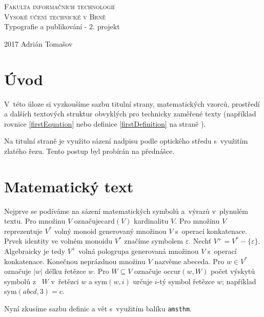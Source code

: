 \documentclass[a4paper, 11pt]{article}
\theoremstyle{definition}
\theoremstyle{theorem}
\begin{document}
\begin{center}
\thispagestyle{empty}
\Huge
\textsc{Fakulta informačních technologií\\
Vysoké učení technické v Brně}\\
Typografie a publikování - 2. projekt\\
\end{center}
{\LARGE 2017 \hfill Adrián Tomašov}

\newpage
\setcounter{page}{1}
\twocolumn

\section*{Úvod}
V~této úloze si vyzkoušíme sazbu titulní strany, matematických vzorců, prostředí a dalších textových struktur obvyklých pro technicky zaměřené texty (například rovnice \ref{firstEquation} nebo definice \ref{firstDefinition} na straně \pageref{firstDefinition}).

Na titulní straně je využito sázení nadpisu podle op\-tického středu s~využitím zlatého řezu. Tento postup byl probírán na přednášce.


\section{Matematický text}

Nejprve se podíváme na sázení matematických symbolů a~výrazů v~plynulém textu. Pro množinu $V$ označuje\linebreak card$(V)$ kardinalitu $V$.
Pro množinu $V$ reprezentuje $V^*$ volný monoid generovaný množinou $V$  s~operací konkatenace.
Prvek identity ve volném monoidu $V^*$ značíme symbolem $\varepsilon$.
Nechť $V^+ = V^*-\{\varepsilon\}$. Algebraicky je tedy $V^+$ volná pologrupa generovaná množinou $V$ s~operací konkatenace.
Konečnou neprázdnou množinu $V$ nazvěme abeceda.
Pro $w \in V^*$ označuje $|w|$ délku řetězce $w$. Pro $W \subseteq V$ označuje occur$(w, W)$ počet výskytů symbolů z~ $W$ v~řetězci $w$ a sym$(w,i)$ určuje $i$-tý symbol řetězce $w$; například sym$(abcd,3)=c$.

Nyní zkusíme sazbu definic a vět s~využitím balíku {\tt amsthm}.
\end{document}
